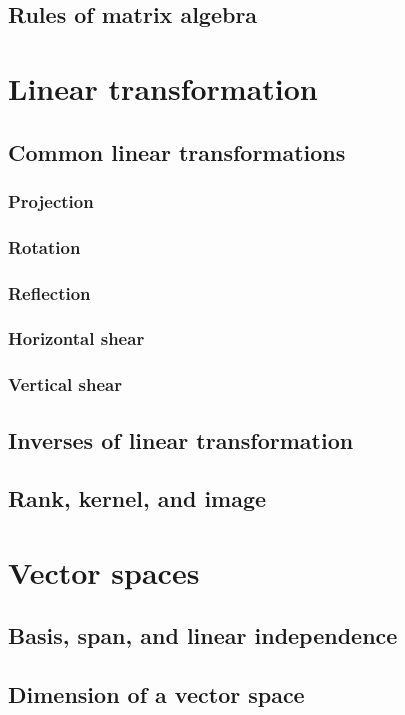 \documentclass{article}
\theoremstyle{definition}
\begin{document}
\subsection{Rules of matrix algebra}

\newpage


\section{Linear transformation}
\subsection{Common linear transformations}
\subsubsection{Projection}
\subsubsection{Rotation}
\subsubsection{Reflection}
\subsubsection{Horizontal shear}
\subsubsection{Vertical shear}
\subsection{Inverses of linear transformation}
\subsection{Rank, kernel, and image}

\newpage

\section{Vector spaces}
\subsection{Basis, span, and linear independence}
\subsection{Dimension of a vector space}
\end{document}
